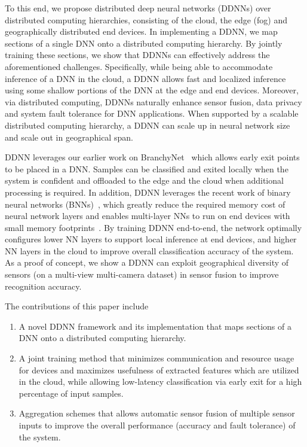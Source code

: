 \documentclass[10pt, conference, compsocconf]{IEEEtran}
\begin{document}
To this end, we propose distributed deep neural networks (DDNNs) over distributed computing hierarchies, consisting of the cloud, the edge (fog) and geographically distributed end devices. In implementing a DDNN, we map sections of a single DNN onto a distributed computing hierarchy. By jointly training these sections, we show that DDNNs can effectively address the aforementioned challenges. Specifically, while being able to accommodate inference of a DNN in the cloud, a DDNN allows fast and localized inference using some shallow portions of the DNN at the edge and end devices. Moreover, via distributed computing, DDNNs naturally enhance sensor fusion, data privacy and system fault tolerance for DNN applications. When supported by a scalable distributed computing hierarchy, a DDNN can scale up in neural network size and scale out in geographical span. 

DDNN leverages our earlier work on BranchyNet~\cite{teerapittayanon2016branchynet} which allows early exit points to be placed in a DNN. Samples can be classified and exited locally when the system is confident and offloaded to the edge and the cloud when additional processing is required. In addition, DDNN leverages the recent work of binary neural networks (BNNs)~\cite{courbariaux2015binaryconnect}, which greatly reduce the required memory cost of neural network layers and enables multi-layer NNs to run on end devices with small memory footprints~\cite{mcdanel2016ebnn}.   By training DDNN end-to-end, the network optimally configures lower NN layers to support local inference at end devices, and higher NN layers in the cloud to improve overall classification accuracy of the system. As a proof of concept, we show a DDNN can exploit geographical diversity of sensors (on a multi-view multi-camera dataset) in sensor fusion to improve recognition accuracy. 

The contributions of this paper include 
\begin{enumerate}
    \item A novel DDNN framework and its implementation that maps sections of a DNN onto a distributed computing hierarchy.
    \item A joint training method that minimizes communication and resource usage for devices and maximizes usefulness of extracted features which are utilized in the cloud, while allowing low-latency classification via early exit for a high percentage of input samples.
    \item Aggregation schemes that allows automatic sensor fusion of multiple sensor inputs to improve the overall performance (accuracy and fault tolerance) of the system.
\end{enumerate} 
\end{document}
